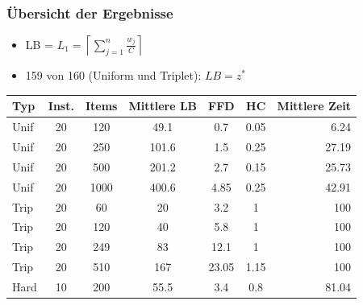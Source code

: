 \documentclass{beamer}
\begin{document}
%
%
\begin{frame}
\frametitle{Übersicht der Ergebnisse}
\begin{footnotesize}
\begin{itemize}
\item LB = $L_1 = \left\lceil\sum_{j=1}^{n} \frac{w_j}{C}\right\rceil$
\item 159 von 160 (Uniform und Triplet): $LB = z^{*}$
\end{itemize}
\end{footnotesize}
\begin{table}
\begin{tabular}{l c c c c c r}
\toprule
\textbf{Typ} & \textbf{Inst.} & \textbf{Items} & \textbf{Mittlere LB} & \textbf{FFD} & \textbf{HC} & \textbf{Mittlere Zeit}\\
\midrule
Unif  & 20   & 120 & 49.1  & 0.7 & 0.05 & 6.24 \\
Unif  & 20   & 250  & 101.6  & 1.5 & 0.25 & 27.19 \\
Unif  & 20   & 500  & 201.2  & 2.7 & 0.15 & 25.73\\
Unif  & 20   & 1000  & 400.6  & 4.85 & 0.25 & 42.91\\ \midrule
Trip  & 20   & 60   & 20  & 3.2 & 1 & 100 \\
Trip  & 20   & 120  & 40  & 5.8 & 1 & 100 \\
Trip  & 20   & 249  & 83  & 12.1 & 1 & 100 \\
Trip  & 20   & 510  & 167  & 23.05 & 1.15 & 100 \\\midrule
Hard  & 10   & 200  & 55.5  & 3.4 & 0.8 &  81.04 \\
\bottomrule
\end{tabular}
\end{table}
\end{frame}


\end{document}
